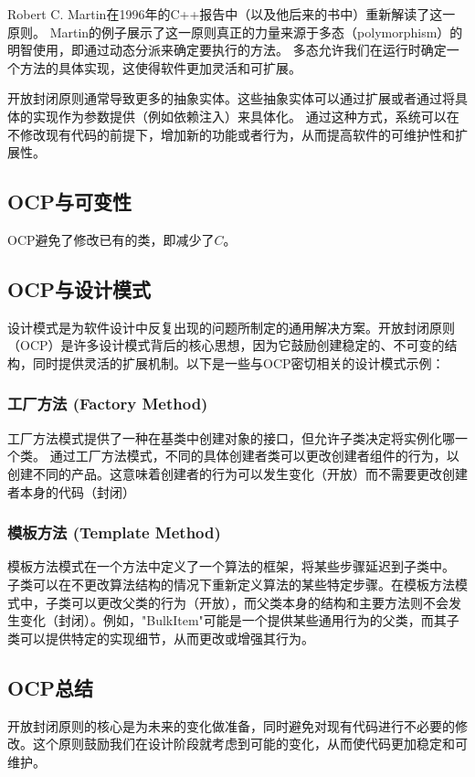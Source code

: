 Robert C. Martin在1996年的C++报告中（以及他后来的书中）重新解读了这一原则。
Martin的例子展示了这一原则真正的力量来源于多态（polymorphism）的明智使用，即通过动态分派来确定要执行的方法。
多态允许我们在运行时确定一个方法的具体实现，这使得软件更加灵活和可扩展。

开放封闭原则通常导致更多的抽象实体。这些抽象实体可以通过扩展或者通过将具体的实现作为参数提供（例如依赖注入）来具体化。
通过这种方式，系统可以在不修改现有代码的前提下，增加新的功能或者行为，从而提高软件的可维护性和扩展性。
\subsection{OCP与可变性}
OCP避免了修改已有的类，即减少了$C$。

\subsection{OCP与设计模式}
设计模式是为软件设计中反复出现的问题所制定的通用解决方案。开放封闭原则（OCP）是许多设计模式背后的核心思想，因为它鼓励创建稳定的、不可变的结构，同时提供灵活的扩展机制。以下是一些与OCP密切相关的设计模式示例：
\subsubsection{工厂方法 (Factory Method)}
工厂方法模式提供了一种在基类中创建对象的接口，但允许子类决定将实例化哪一个类。
通过工厂方法模式，不同的具体创建者类可以更改创建者组件的行为，以创建不同的产品。这意味着创建者的行为可以发生变化（开放）而不需要更改创建者本身的代码（封闭）
\subsubsection{模板方法 (Template Method)}
模板方法模式在一个方法中定义了一个算法的框架，将某些步骤延迟到子类中。
子类可以在不更改算法结构的情况下重新定义算法的某些特定步骤。在模板方法模式中，子类可以更改父类的行为（开放），而父类本身的结构和主要方法则不会发生变化（封闭）。例如，"BulkItem"可能是一个提供某些通用行为的父类，而其子类可以提供特定的实现细节，从而更改或增强其行为。

\subsection{OCP总结}

开放封闭原则的核心是为未来的变化做准备，同时避免对现有代码进行不必要的修改。这个原则鼓励我们在设计阶段就考虑到可能的变化，从而使代码更加稳定和可维护。

